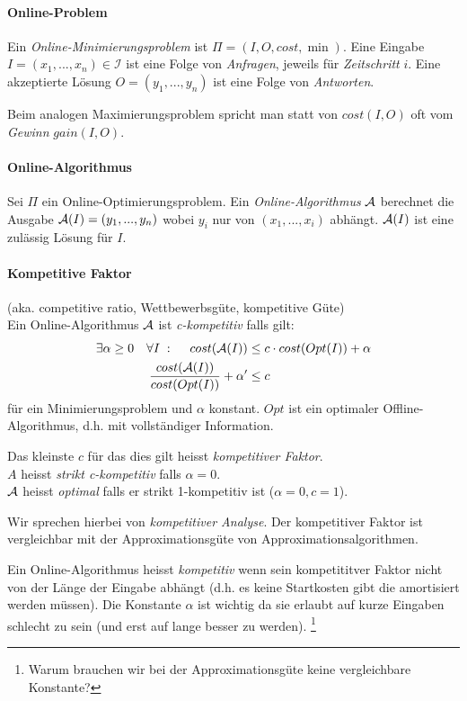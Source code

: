 \paragraph{Online-Problem}
Ein \emph{Online-Minimierungsproblem} ist $\Pi = (I, O, cost, \min)$.
Eine Eingabe $I = (x_1, ..., x_n) \in \mathcal{I}$ ist eine Folge von \emph{Anfragen},
jeweils für \emph{Zeitschritt} $i$.
Eine akzeptierte Lösung $O = (y_1, ..., y_n)$ ist eine Folge von \emph{Antworten}.

Beim analogen Maximierungsproblem spricht man statt von $cost(I, O)$ oft vom \emph{Gewinn} $gain(I,O)$.

\paragraph{Online-Algorithmus}
Sei $\Pi$ ein Online-Optimierungsproblem.
Ein \emph{Online-Algorithmus} $\mathcal{A}$ berechnet die Ausgabe $\mathcal{A}(I) = (y_1, ..., y_n) $
wobei $y_i$ nur von $(x_1, ..., x_i)$ abhängt.
$\mathcal{A}(I)$ ist eine zulässig Lösung für $I$.

\paragraph{Kompetitive Faktor}
(aka. competitive ratio, Wettbewerbsgüte, kompetitive Güte) \\
Ein Online-Algorithmus $\mathcal{A}$ ist \emph{c-kompetitiv} falls gilt:
\begin{align*}
\exists \alpha \geq 0 \quad \forall I \; : \; \quad cost(\mathcal{A}(I)) & \leq c \cdot cost(Opt(I)) + \alpha \\
\dfrac{cost(\mathcal{A}(I))}{cost(Opt(I))} + \alpha' & \leq c
\end{align*}
für ein Minimierungsproblem und $\alpha$ konstant.
$Opt$ ist ein optimaler Offline-Algorithmus, d.h. mit vollständiger Information.

Das kleinste $c$ für das dies gilt heisst \emph{kompetitiver Faktor}. \\
$A$ heisst \emph{strikt c-kompetitiv} falls $\alpha = 0$. \\
$\mathcal{A}$ heisst \emph{optimal} falls er strikt 1-kompetitiv ist ($\alpha = 0, c = 1$).

Wir sprechen hierbei von \emph{kompetitiver Analyse}.
Der kompetitiver Faktor ist vergleichbar mit der Approximationsgüte von Approximationsalgorithmen.

Ein Online-Algorithmus heisst \emph{kompetitiv} wenn sein kompetititver Faktor nicht von der
Länge der Eingabe abhängt (d.h. es keine Startkosten gibt die amortisiert werden müssen).
Die Konstante $\alpha$ ist wichtig da sie erlaubt auf kurze Eingaben schlecht zu sein
(und erst auf lange besser zu werden).
\footnote{Warum brauchen wir bei der Approximationsgüte keine vergleichbare Konstante?}

